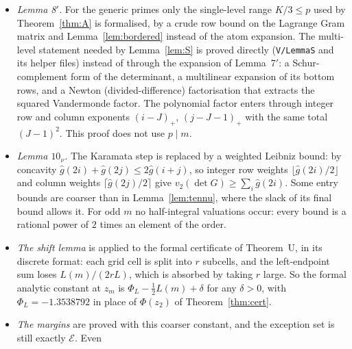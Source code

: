 \documentclass[11pt]{amsart}
\theoremstyle{definition}
\theoremstyle{remark}
\numberwithin{equation}{section}
\newcommand{\QQ}{\mathbb{Q}}
\newcommand{\cE}{\mathcal{E}}
\newcommand{\lean}[1]{{\def\_{\textunderscore\allowbreak}\texttt{#1}}}
\begin{document}
\begin{itemize}
  exponent exceeds the linear-majorant one by at most $B/(2Lr)$, $B=\sum_k|e_{1,k}-e_{0,k}|$
  (\lean{LinCertU.exists\_dual}), so the analytic theorem is applied unchanged. For Corollary~\ref{thm:U} the step
  density has $10$ cells of width $\frac15$ and the grid has $L=40$ ($160$ cells); the certified value is
  $\Phi_\QQ=-27083980489111/20000000000000\approx-1.3541990$, coarser than Theorem~\ref{thm:cert} but enough. The formal
  statements are $\Phi<\Phi_L:=-1.3538792$ (\lean{exists\_certU'}; the rounded constant $\Phi_L$ is the one used by
  the shift lemma below) and $\Phi<-27/20$ (\lean{exists\_certU}); the assembly (\lean{boundsU}) uses $\beta=-27/20$, so
  the formal margin is $\frac43-\frac{27}{20}=-\frac1{60}$.
\item \emph{Lemma 8$'$.} For the generic primes only the single-level range $K/3\le p$ used by Theorem~\ref{thm:A} is
  formalised, by a crude row bound on the Lagrange Gram matrix and Lemma~\ref{lem:bordered} instead of the atom
  expansion. The multi-level statement needed by Lemma~\ref{lem:S} is proved directly (\lean{V\slash{}LemmaS} and its
  helper files) instead of through the expansion of Lemma~7$'$: a Schur-complement form of the determinant, a
  multilinear expansion of its bottom rows, and a Newton (divided-difference) factorisation that extracts the squared
  Vandermonde factor. The polynomial factor enters through integer row and column exponents $(i-J)_+$, $(j-J-1)_+$ with
  the same total $(J-1)^2$. This proof does not use $p\mid m$.
\item \emph{Lemma $10_\nu$.} The Karamata step is replaced by a weighted Leibniz bound: by concavity
  $\hat g(2i)+\hat g(2j)\le2\hat g(i+j)$, so integer row weights $\lfloor\hat g(2i)/2\rfloor$ and column weights
  $\lceil\hat g(2j)/2\rceil$ give $v_2(\det G)\ge\sum_i\hat g(2i)$. Some entry bounds are coarser than in
  Lemma~\ref{lem:tennu}, where the slack of its final bound allows it. For odd $m$ no half-integral valuations occur:
  every bound is a rational power of $2$ times an element of the order.
\item \emph{The shift lemma} is applied to the formal certificate of Theorem~U, in its discrete format: each grid cell is
  split into $r$ subcells, and the left-endpoint sum loses $L(m)/(2rL)$, which is absorbed by taking $r$ large. So the
  formal analytic constant at $z_m$ is $\Phi_L-\frac12L(m)+\delta$ for any $\delta>0$, with
  $\Phi_L=-1.3538792$ in place of $\Phi(z_2)$ of Theorem~\ref{thm:cert}.
\item \emph{The margins} are proved with this coarser constant, and the exception set is still exactly $\cE$. Even

\end{itemize}
\end{document}
